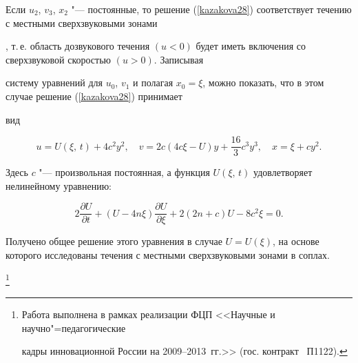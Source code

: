 Если $u_2$, $v_3$, $x_2$ "--- постоянные, то решение (\ref{kazakova28}) соответствует течению с местными сверхзвуковыми зонами

\cite{Adamson}, т.\,е. область дозвукового течения $(u<0)$ будет иметь включения со сверхзвуковой скоростью $(u>0)$. Записывая

систему уравнений для $u_0$, $v_1$ и полагая $x_0=\xi$, можно показать, что в этом случае решение (\ref{kazakova28}) принимает

вид

$$

u=U(\xi,\,t)+4c^2y^2,\quad v=2c(4c{\xi}-U)y+\frac{16}{3}c^3y^3, \quad x=\xi+cy^2.

$$

Здесь $c$ "--- произвольная постоянная, а функция $U(\xi,\,t)$ удовлетворяет нелинейному уравнению:

\begin{equation}

\label{kazakova21} 2\frac{\partial U}{\partial t}+(U-4n \xi)\frac{\partial U}{\partial \xi}+2(2n+c)U-8c^2 \xi=0.

\end{equation}



Получено общее решение этого уравнения в случае $U=U(\xi)$, на основе которого исследованы течения с местными сверхзвуковыми зонами в соплах.



\thanks{Работа выполнена в рамках реализации ФЦП <<Научные и научно"=педагогические

кадры инновационной России на 2009--2013~гг.>> (гос. контракт \No~П1122).}



\newpage



